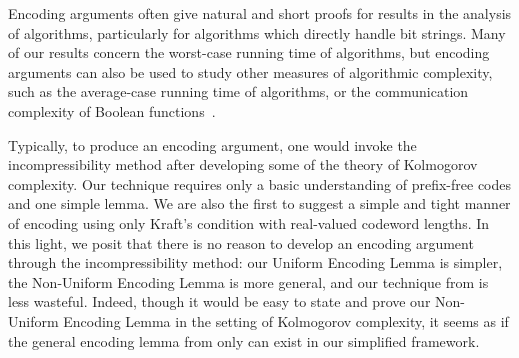 \documentclass[format=acmsmall, review=false, screen=true]{acmart}
\begin{document}
Encoding arguments often give natural and short proofs for results in
the analysis of algorithms, particularly for algorithms which directly
handle bit strings. Many of our results concern the worst-case running
time of algorithms, but encoding arguments can also be used to study
other measures of algorithmic complexity, such as the average-case
running time of algorithms, or the communication complexity of Boolean
functions~\cite{buhrman:newapps}.

Typically, to produce an encoding argument, one would invoke the
incompressibility method after developing some of the theory of
Kolmogorov complexity. Our technique requires only a basic
understanding of prefix-free codes and one simple lemma. We are also
the first to suggest a simple and tight manner of encoding using only
Kraft's condition with real-valued codeword lengths. In this light, we
posit that there is no reason to develop an encoding argument through
the incompressibility method: our Uniform Encoding Lemma is simpler,
the Non-Uniform Encoding Lemma is more general, and our technique from
 is less wasteful. Indeed, though it would be easy to state
and prove our Non-Uniform Encoding Lemma in the setting of Kolmogorov
complexity, it seems as if the general encoding lemma from 
only can exist in our simplified framework.

\end{document}
